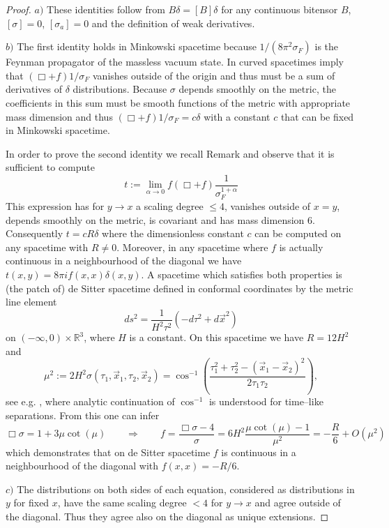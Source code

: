 \documentclass[11pt]{book}
\newcommand{\com}[1]{{\color{red}\bf #1}}
\newcommand{\Rbb}{\mathbb{R}}
\theoremstyle{break}
\begin{document}
\com{
\begin{proof}
$a)$ These identities follow from $B\delta=[B]\delta$ for any continuous bitensor $B$, $[\sigma]=0$, $[\sigma_a]=0$ and the definition of weak derivatives.

$b)$ The first identity holds in Minkowski spacetime because $1/(8\pi^2\sigma_F)$ is the Feynman propagator of the massless vacuum state. In curved spacetimes %
imply that $(\Box+f)1/\sigma_F$ vanishes outside of the origin and thus must be a sum of derivatives of $\delta$ distributions. Because $\sigma$ depends smoothly on the metric, the coefficients in this sum must be smooth functions of the metric with appropriate mass dimension and thus $(\Box+f)1/\sigma_F=c\delta$ with a constant $c$ that can be fixed in Minkowski spacetime. 

In order to prove the second identity we recall Remark %
and observe that it is sufficient to compute 
%
$$
t:=\lim_{\alpha\to 0}f(\Box+f)\frac{1}{\sigma^{1+\alpha}_F}
$$
%
This expression has for $y\to x$ a scaling degree $\le 4$, vanishes outside of $x=y$, depends smoothly on the metric, is covariant and has mass dimension $6$. Consequently $t=cR\delta$ where the dimensionless constant $c$ can be computed on any spacetime with $R\neq 0$. Moreover, in any spacetime where $f$ is actually continuous in a neighbourhood of the diagonal we have $t(x,y)=8\pi i f(x,x) \delta(x,y)$. A spacetime which satisfies both properties is (the patch of) de Sitter spacetime defined in conformal coordinates by the metric line element 
%
$$ds^2=\frac{1}{H^2\tau^2}\left(-d\tau^2 + d\vec{x}^2\right)$$
%
on $(-\infty,0)\times\Rbb^3$, where $H$ is a constant. On this spacetime we have $R=12H^2$ and
%
$$\mu^2:=2 H^2 \sigma(\tau_1,\vec{x}_1,\tau_2,\vec{x}_2)=\cos^{-1}\left(\frac{\tau^2_1+\tau^2_2-(\vec{x}_1-\vec{x}_2)^2}{2\tau_1\tau_2}\right),$$
%
see e.g. %
, where analytic continuation of $\cos^{-1}$ is understood for time--like separations. From this one can infer 
%
$$
\Box \sigma = 1+3 \mu \cot (\mu) \qquad \Rightarrow \qquad f = \frac{\Box \sigma-4}{\sigma} = 6H^2 \frac{\mu \cot (\mu) - 1}{\mu^2}= -\frac{R}{6} + O(\mu^2)
$$
%
which demonstrates that on de Sitter spacetime $f$ is continuous in a neighbourhood of the diagonal with $f(x,x)=-R/6$. 

$c)$ The distributions on both sides of each equation, considered as distributions in $y$ for fixed $x$, have the same scaling degree $<4$ for $y\to x$ and agree outside of the diagonal. Thus they agree also on the diagonal as unique extensions.


\end{proof}}
\end{document}
